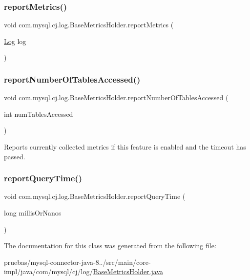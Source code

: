 \subsubsection{\texorpdfstring{report\+Metrics()}{reportMetrics()}}
{\footnotesize\ttfamily void com.\+mysql.\+cj.\+log.\+Base\+Metrics\+Holder.\+report\+Metrics (\begin{DoxyParamCaption}\item[{\mbox{\hyperlink{interfacecom_1_1mysql_1_1cj_1_1log_1_1_log}{Log}}}]{log }\end{DoxyParamCaption})}

\mbox{\label{classcom_1_1mysql_1_1cj_1_1log_1_1_base_metrics_holder_a75061da20b187347e1bd4d07e0c7db34}} 
\subsubsection{\texorpdfstring{report\+Number\+Of\+Tables\+Accessed()}{reportNumberOfTablesAccessed()}}
{\footnotesize\ttfamily void com.\+mysql.\+cj.\+log.\+Base\+Metrics\+Holder.\+report\+Number\+Of\+Tables\+Accessed (\begin{DoxyParamCaption}\item[{int}]{num\+Tables\+Accessed }\end{DoxyParamCaption})}

Reports currently collected metrics if this feature is enabled and the timeout has passed. \mbox{\label{classcom_1_1mysql_1_1cj_1_1log_1_1_base_metrics_holder_a46e6e0b9a7b352ab1ed37dea9d193913}} 
\subsubsection{\texorpdfstring{report\+Query\+Time()}{reportQueryTime()}}
{\footnotesize\ttfamily void com.\+mysql.\+cj.\+log.\+Base\+Metrics\+Holder.\+report\+Query\+Time (\begin{DoxyParamCaption}\item[{long}]{millis\+Or\+Nanos }\end{DoxyParamCaption})}



The documentation for this class was generated from the following file\+:\begin{DoxyCompactItemize}
\item 
pruebas/mysql-\/connector-\/java-\/8../src/main/core-\/impl/java/com/mysql/cj/log/\mbox{\hyperlink{_base_metrics_holder_8java}{Base\+Metrics\+Holder.\+java}}\end{DoxyCompactItemize}
